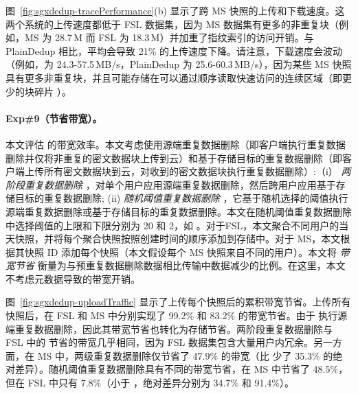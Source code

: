 图~\ref{fig:sgxdedup-tracePerformance}(b) 显示了跨 MS 快照的上传和下载速度。这两个系统的上传速度都低于 FSL 数据集，因为 MS 数据集有更多的非重复块（例如，MS 为 28.7\,M 而 FSL 为 18.3\,M）并加重了指纹索引的访问开销。与 PlainDedup 相比，\sysnameS 平均会导致 21\% 的上传速度下降。请注意，下载速度会波动（例如，\sysnameS 为 24.3-57.5\,MB/s，PlainDedup 为 25.6-60.3\,MB/s），因为某些 MS 快照具有更多非重复块，并且可能存储在可以通过顺序读取快速访问的连续区域（即更少的块碎片 \cite{lillibridge13}）。

\paragraph*{Exp\#9（节省带宽）。} 本文评估 \sysnameS 的带宽效率。本文考虑使用源端重复数据删除（即客户端执行重复数据删除并仅将非重复的密文数据块上传到云）和基于存储目标的重复数据删除（即客户端上传所有密文数据块到云，对收到的密文数据块执行重复数据删除）:（i）\textit{ 两阶段重复数据删除} \cite{li15}，对单个用户应用源端重复数据删除，然后跨用户应用基于存储目标的重复数据删除; (ii) \textit{ 随机阈值重复数据删除} \cite{harnik10}，它基于随机选择的阈值执行源端重复数据删除或基于存储目标的重复数据删除。本文在随机阈值重复数据删除中选择阈值的上限和下限分别为 20 和 2，如 \cite{harnik10}。对于FSL，本文聚合不同用户的当天快照，并将每个聚合快照按照创建时间的顺序添加到存储中。对于 MS，本文根据其快照 ID 添加每个快照（本文假设每个 MS 快照来自不同的用户）。本文将 \textit{ 带宽节省} 衡量为与预重复数据删除数据相比传输中数据减少的比例。在这里，本文不考虑元数据导致的带宽开销。

图~\ref{fig:sgxdedup-uploadTraffic} 显示了上传每个快照后的累积带宽节省。上传所有快照后，\sysnameS 在 FSL 和 MS 中分别实现了 99.2\% 和 83.2\% 的带宽节省。由于 \sysnameS 执行源端重复数据删除，因此其带宽节省也转化为存储节省。两阶段重复数据删除与 FSL 中的 \sysnameS 节省的带宽几乎相同，因为 FSL 数据集包含大量用户内冗余。另一方面，在 MS 中，两级重复数据删除仅节省了 47.9\% 的带宽（比 \sysnameS 少了 35.3\% 的绝对差异）。随机阈值重复数据删除具有不同的带宽节省，在 MS 中节省了 48.5\%，但在 FSL 中只有 7.8\%（小于 \sysnameS，绝对差异分别为 34.7\% 和 91.4\%）。


